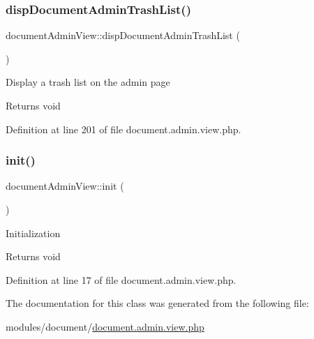 \subsubsection{\texorpdfstring{disp\+Document\+Admin\+Trash\+List()}{dispDocumentAdminTrashList()}}
{\footnotesize\ttfamily document\+Admin\+View\+::disp\+Document\+Admin\+Trash\+List (\begin{DoxyParamCaption}{ }\end{DoxyParamCaption})}

Display a trash list on the admin page \begin{DoxyReturn}{Returns}
void 
\end{DoxyReturn}


Definition at line 201 of file document.\+admin.\+view.\+php.

\mbox{\label{classdocumentAdminView_aed09978af62e856f18f80e8573968c3c}} 
\subsubsection{\texorpdfstring{init()}{init()}}
{\footnotesize\ttfamily document\+Admin\+View\+::init (\begin{DoxyParamCaption}{ }\end{DoxyParamCaption})}

Initialization \begin{DoxyReturn}{Returns}
void 
\end{DoxyReturn}


Definition at line 17 of file document.\+admin.\+view.\+php.



The documentation for this class was generated from the following file\+:\begin{DoxyCompactItemize}
\item 
modules/document/\hyperlink{document_8admin_8view_8php}{document.\+admin.\+view.\+php}\end{DoxyCompactItemize}
